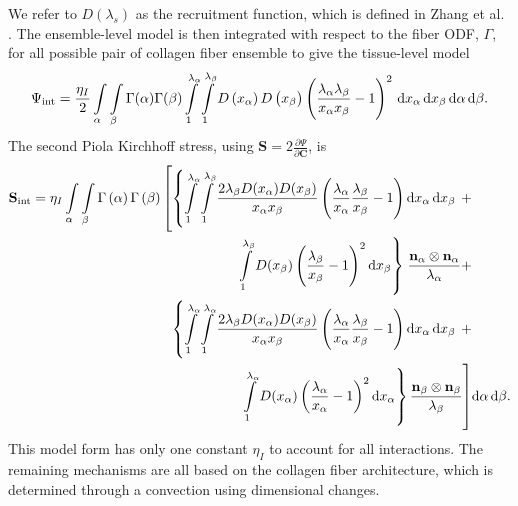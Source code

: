     We refer to $D(\lambda_s)$ as the recruitment function, which is defined in Zhang et al. \cite{zhang_meso_2016}. The ensemble-level model is then integrated with respect to the fiber ODF, $\Gamma$, for all possible pair of collagen fiber ensemble to give the tissue-level model
\begin{equation}
\Psi_{\mathrm{int}} = \frac{\eta_I}{2} \int\displaylimits_\alpha \int\displaylimits_\beta \Gamma(\alpha) \Gamma(\beta) \int\displaylimits_1^{\lambda_\alpha} \int\displaylimits_1^{\lambda_\beta} D\left( x_\alpha \right) D\left( x_\beta \right) \left( \frac{\lambda_\alpha \lambda_\beta}{x_\alpha x_\beta} - 1\right)^2 \,\mathrm{d}x_\alpha \,\mathrm{d}x_\beta \,\mathrm{d}\alpha \,\mathrm{d}\beta.
\end{equation}
    The second Piola Kirchhoff stress, using $\mathbf{S}=2\frac{\partial\Psi}{\partial\mathbf{C}}$, is 
\begin{equation} \label{eq:interaction}
\begin{split}
\mathbf{S}_{\mathrm{int}} = \eta_I \int\displaylimits_\alpha \int\displaylimits_\beta \Gamma \left(\alpha \right) \Gamma \left( \beta \right) 
\left[ \left\lbrace 
\int\displaylimits_1^{\lambda_\alpha} \int\displaylimits_1^{\lambda_\beta} 
\frac{2 \lambda_\beta D(x_\alpha) D(x_\beta)}{x_\alpha x_\beta} 
\left( \frac{\lambda_\alpha}{x_\alpha} \frac{\lambda_\beta}{x_\beta} - 1\right) \mathrm{d}x_\alpha \, \mathrm{d}x_\beta \right.\right. +&\\
\left. \left. \int\displaylimits_1^{\lambda_\beta} D(x_\beta) \left( \frac{\lambda_\beta}{x_\beta} -1  \right)^2 \mathrm{d}x_\beta \right\rbrace \right.  \frac{\mathbf{n}_\alpha \otimes \mathbf{n}_\alpha}{\lambda_\alpha} +& \\
\left. \left\lbrace
\int\displaylimits_1^{\lambda_\alpha} \int\displaylimits_1^{\lambda_\alpha} 
\frac{2 \lambda_\beta D(x_\alpha) D(x_\beta)}{x_\alpha x_\beta} 
\left( \frac{\lambda_\alpha}{x_\alpha} \frac{\lambda_\beta}{x_\beta} - 1\right) \mathrm{d}x_\alpha \, \mathrm{d}x_\beta 
\right. \right. +&\\
\left. \left. \int\displaylimits_1^{\lambda_\alpha} D(x_\alpha) \left( \frac{\lambda_\alpha}{x_\alpha} -1  \right)^2 \mathrm{d}x_\alpha \right\rbrace \frac{\mathbf{n}_\beta \otimes \mathbf{n}_\beta}{\lambda_\beta}  \right]& \mathrm{d}\alpha \, \mathrm{d}\beta.
\end{split}
\end{equation}
    This model form has only one constant $\eta_I$ to account for all interactions. The remaining mechanisms are all based on the collagen fiber architecture, which is determined through a convection using dimensional changes. 